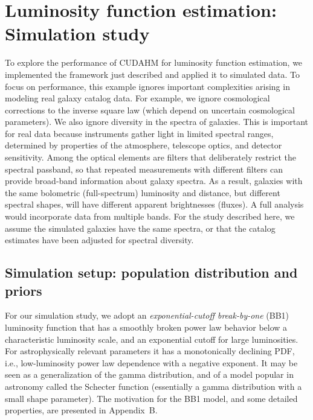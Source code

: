 \section{Luminosity function estimation: Simulation study}
\label{sec:lum_func_sim}

To explore the performance of CUDAHM for luminosity function estimation, we implemented the framework just described and applied it to simulated data.
To focus on performance, this example ignores important complexities arising in modeling real galaxy catalog data.
For example, we ignore cosmological corrections to the inverse square law (which depend on uncertain cosmological parameters).
We also ignore diversity in the spectra of galaxies.
This is important for real data because instruments gather light in limited spectral ranges, determined by properties of the atmosphere, telescope optics, and detector sensitivity.
Among the optical elements are filters that deliberately restrict the spectral passband, so that repeated measurements with different filters can provide broad-band information about galaxy spectra.
As a result, galaxies with the same bolometric (full-spectrum) luminosity and distance, but different spectral shapes, will have different apparent brightnesses (fluxes).
A full analysis would incorporate data from multiple bands.
For the study described here, we assume the simulated galaxies have the same spectra, or that the catalog estimates have been adjusted for spectral diversity.

\subsection{Simulation setup: population distribution and priors}
\label{sec:simsetup-popn}

For our simulation study, we adopt an \emph{exponential-cutoff break-by-one} (BB1) luminosity function that has a smoothly broken power law behavior below a characteristic luminosity scale, and an exponential cutoff for large luminosities.
For astrophysically relevant parameters it has a monotonically declining PDF, i.e., low-luminosity power law dependence with a negative exponent.
It may be seen as a generalization of the gamma distribution, and of a  model popular in astronomy called the Schecter function (essentially a gamma distribution with a small shape parameter).
The motivation for the BB1 model, and some detailed properties, are presented in Appendix~B.
  
